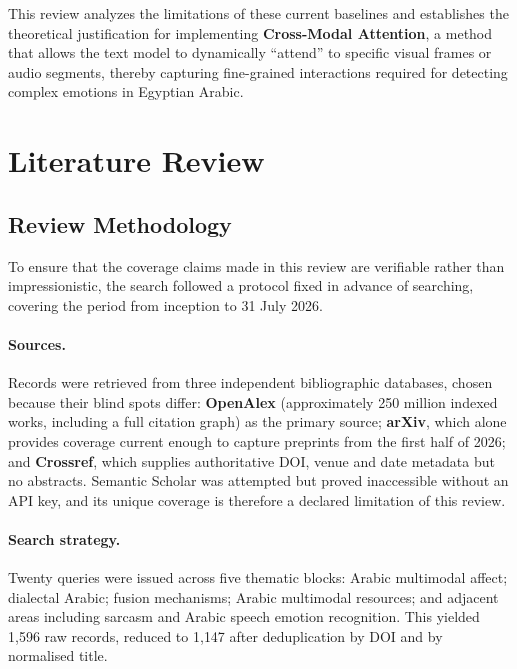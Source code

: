 \documentclass[12pt, a4paper]{article}
\begin{document}
This review analyzes the limitations of these current baselines and establishes the theoretical justification for implementing \textbf{Cross-Modal Attention}, a method that allows the text model to dynamically ``attend'' to specific visual frames or audio segments, thereby capturing fine-grained interactions required for detecting complex emotions in Egyptian Arabic.


\section{Literature Review}\label{sec:lit_review}

\subsection{Review Methodology}\label{sec:method_review}
To ensure that the coverage claims made in this review are verifiable rather than impressionistic, the search followed a protocol fixed in advance of searching, covering the period from inception to 31 July 2026.

\paragraph{Sources.} Records were retrieved from three independent bibliographic databases, chosen because their blind spots differ: \textbf{OpenAlex} (approximately 250 million indexed works, including a full citation graph) as the primary source; \textbf{arXiv}, which alone provides coverage current enough to capture preprints from the first half of 2026; and \textbf{Crossref}, which supplies authoritative DOI, venue and date metadata but no abstracts. Semantic Scholar was attempted but proved inaccessible without an API key, and its unique coverage is therefore a declared limitation of this review.

\paragraph{Search strategy.} Twenty queries were issued across five thematic blocks: Arabic multimodal affect; dialectal Arabic; fusion mechanisms; Arabic multimodal resources; and adjacent areas including sarcasm and Arabic speech emotion recognition. This yielded 1{,}596 raw records, reduced to 1{,}147 after deduplication by DOI and by normalised title.
\end{document}
